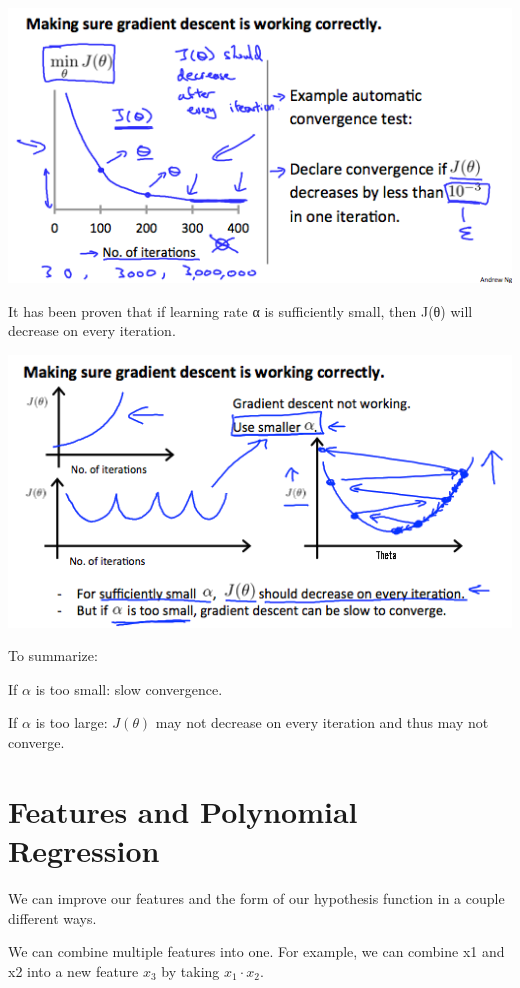 \documentclass[10pt,a4paper,UTF8]{article}
\begin{document}
\begin{center}
\includegraphics[width=.9\linewidth]{../../img/computer_ng/20171006costFunctionofIteration.png}
\end{center}

It has been proven that if learning rate α is sufficiently small, then J(θ) will decrease on every iteration.

\begin{center}
\includegraphics[width=.9\linewidth]{../../img/computer_ng/20171006costFunctionofIteration2.png}
\end{center}

To summarize:

If \(\alpha\) is too small: slow convergence.

If \(\alpha\) is too large: \(J(\theta)\) may not decrease on every iteration and thus may not converge.
\section{Features and Polynomial Regression}
\label{sec:org6a44efe}


We can improve our features and the form of our hypothesis function in a couple different ways.

We can combine multiple features into one. For example, we can combine x1 and x2 into a new feature \(x_{3}\) by taking \(x_{1}\cdot x_{2}\).
\end{document}
